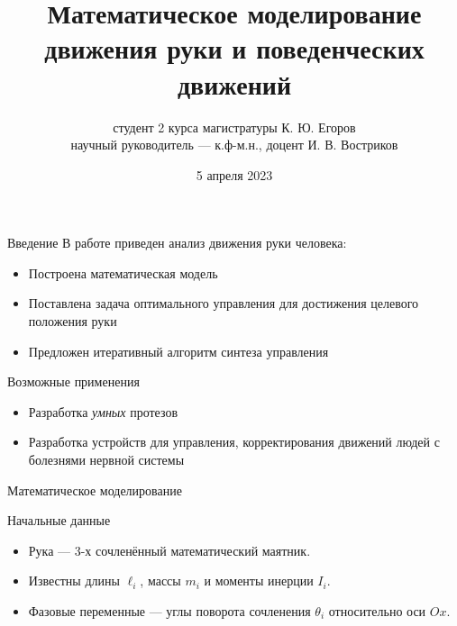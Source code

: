 \documentclass[16pt]{beamer}
\title[Конференция <<Ломоносовские чтения 2023>>]
        {Математическое моделирование движения руки и поведенческих движений}
\author[К. Ю. Егоров]
        {студент 2 курса магистратуры К. Ю. Егоров\\
        научный руководитель --- к.ф-м.н., доцент И. В. Востриков}
\institute{Кафедра системного анализа\\ ВМК МГУ}
\date{5 апреля 2023}
\begin{document}
    \begin{frame}
        \titlepage
    \end{frame}

    \begin{frame}{Введение}
        В работе приведен анализ движения руки человека:
        \begin{itemize}
            \item Построена математическая модель
            \item Поставлена задача оптимального управления для достижения целевого положения руки
            \item Предложен итеративный алгоритм синтеза управления
        \end{itemize}
        \vfill
        \begin{block}{Возможные применения}
            \begin{itemize}
                \item Разработка \textit{умных} протезов
                \item Разработка устройств для управления, корректирования движений людей с болезнями нервной системы
            \end{itemize}
            
        \end{block}
    \end{frame}

    \begin{frame}{Математическое моделирование}
        \begin{block}{Начальные данные}
            \begin{itemize}
                \item Рука --- 3-х сочленённый математический маятник.
                \item Известны длины $\ell_i$, массы $m_i$ и моменты инерции $I_i$.
                \item Фазовые переменные --- углы поворота сочленения $\theta_i$ относительно оси $Ox$. 
            \end{itemize}
        \end{block}
    \end{frame}
\end{document}
